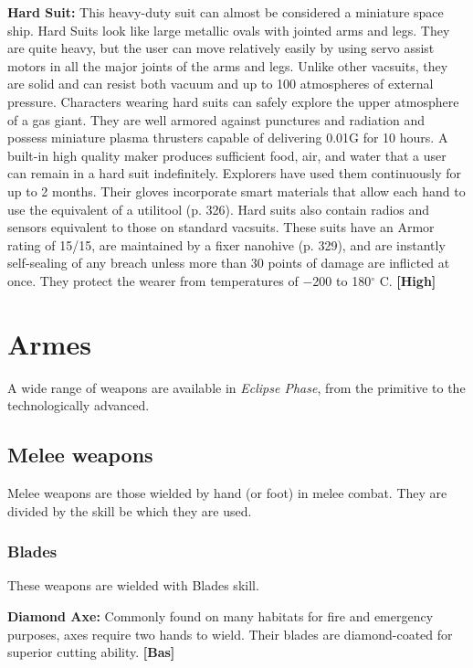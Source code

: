 {{\textbf{Hard Suit:} This heavy-duty suit can almost be considered a miniature space ship. Hard Suits look like large metallic ovals with jointed arms and legs. They are quite heavy, but the user can move relatively easily by using servo assist motors in all the major joints of the arms and legs. Unlike other vacsuits, they are solid and can resist both vacuum and up to 100 atmospheres of external pressure. Characters wearing hard suits can safely explore the upper atmosphere of a gas giant. They are well armored against punctures and radiation and possess miniature plasma thrusters capable of delivering 0.01G for 10 hours. A built-in high quality maker produces sufficient food, air, and water that a user can remain in a hard suit indefinitely. Explorers have used them continuously for up to 2 months. Their gloves incorporate smart materials that allow each hand to use the equivalent of a utilitool (p. 326). Hard suits also contain radios and sensors equivalent to those on standard vacsuits. These suits have an Armor rating of 15/15, are maintained by a fixer nanohive (p. 329), and are instantly self-sealing of any breach unless more than 30 points of damage are inflicted at once. They protect the wearer from temperatures of $-$200 to 180$^{\circ}$ C. \textbf{[High]} 



\section{Armes} \label{sec:weapons} 

A wide range of weapons are available in \emph{Eclipse Phase}, from the primitive to the technologically advanced. 



\subsection{Melee weapons} \label{sec:melee-weapons} 

Melee weapons are those wielded by hand (or foot) in melee combat. They are divided by the skill be which they are used. 

\subsubsection{Blades} 

These weapons are wielded with Blades skill. 

\textbf{Diamond Axe:} Commonly found on many habitats for fire and emergency purposes, axes require two hands to wield. Their blades are diamond-coated for superior cutting ability. \textbf{[Bas]} 

}}
